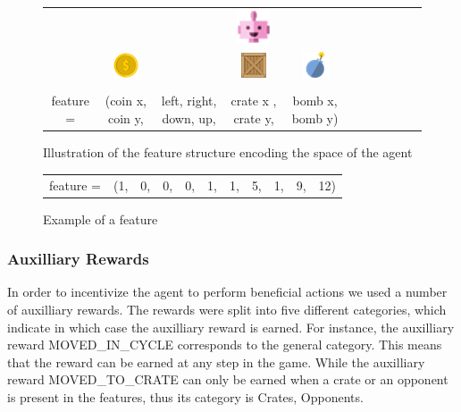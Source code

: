 \documentclass[
	letterpaper, %
	10pt, %
]{CSUniSchoolLabReport}
\begin{document}
\begin{center}
	\begin{figure}[H]
		\begin{tabular}{ccccccccccc}
			          &                                                               &                           & \multicolumn{1}{c}{\includegraphics[width=1cm]{Figures/robot_pink.png}}          &                                                             \\
			          & \multicolumn{1}{c}{\includegraphics{Figures/coin.png}}        &                           & \multicolumn{1}{c}{\includegraphics{Figures/crate.png}}                          & \multicolumn{1}{c}{\includegraphics{Figures/bomb_blue.png}} \\
			\\
			feature = & (coin x,                                              coin y, & left,  right,  down,  up, & crate x ,                                                               crate y, & bomb x,  bomb y)
		\end{tabular}
		\caption{Illustration of the feature structure encoding the space of the agent}
	\end{figure}
\end{center}


\begin{center}
	\begin{figure}[h]
		\centering
		\begin{tabular}{ccccccccccc}
			feature = & (1, & 0, & 0, & 0, & 1, & 1, & 5, & 1, & 9, & 12)
		\end{tabular}
		\caption{Example of a feature }
		\label{fig:example}
	\end{figure}
\end{center}



\subsubsection*{Auxilliary Rewards}
In order to incentivize the agent to perform beneficial actions we used a number of auxilliary rewards.
The rewards were split into five different categories, which indicate in which case the auxilliary reward
is earned. For instance, the auxilliary reward MOVED\_IN\_CYCLE corresponds to the general category. This
means that the reward can be earned at any step in the game. While the auxilliary reward MOVED\_TO\_CRATE can
only be earned when a crate or an opponent is present in the features, thus its category is Crates, Opponents.
\end{document}
